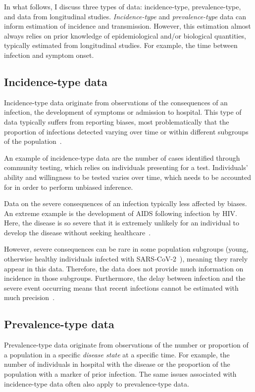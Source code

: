 \documentclass[thesis.tex]{subfiles}
\begin{document}
In what follows, I discuss three types of data: incidence-type, prevalence-type, and data from longitudinal studies.
\emph{Incidence-type} and \emph{prevalence-type} data can inform estimation of incidence and transmission.
However, this estimation almost always relies on prior knowledge of epidemiological and/or biological quantities, typically estimated from longitudinal studies.
For example, the time between infection and symptom onset.

\subsection{Incidence-type data}

Incidence-type data originate from observations of the consequences of an infection, \eg the development of symptoms or admission to hospital.
This type of data typically suffers from reporting biases, most problematically that the proportion of infections detected varying over time or within different subgroups of the population~\autocites[chapter 9]{lashModern}{shadboltChallenges}.

An example of incidence-type data are the number of cases identified through community testing, which relies on individuals presenting for a test.
Individuals' ability and willingness to be tested varies over time, which needs to be accounted for in order to perform unbiased inference.

Data on the severe consequences of an infection typically less affected by biases.
An extreme example is the development of AIDS following infection by HIV.
Here, the disease is so severe that it is extremely unlikely for an individual to develop the disease without seeking healthcare~\autocite{evansCompleteness}.

However, severe consequences can be rare in some population subgroups (\eg young, otherwise healthy individuals infected with SARS-CoV-2~\autocite{wardSero,bhopalChildren}), meaning they rarely appear in this data.
Therefore, the data does not provide much information on incidence in those subgroups.
Furthermore, the delay between infection and the severe event occurring means that recent infections cannot be estimated with much precision~\autocite{swallow2022challenges}.

\subsection{Prevalence-type data}

Prevalence-type data originate from observations of the number or proportion of a population in a specific \emph{disease state} at a specific time.
For example, the number of individuals in hospital with the disease or the proportion of the population with a marker of prior infection.
The same issues associated with incidence-type data often also apply to prevalence-type data.
\end{document}
